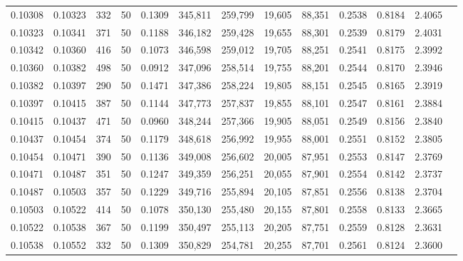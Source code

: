 \begin{tabular}{rrrrrrrrrrrrr}
0.10308 & 0.10323 &   332 &  50 &                                     0.1309 & 345,811 & 259,799 &  19,605 &  88,351 & 0.2538 & 0.8184 & 2.4065 \\
0.10323 & 0.10341 &   371 &  50 &                                     0.1188 & 346,182 & 259,428 &  19,655 &  88,301 & 0.2539 & 0.8179 & 2.4031 \\
0.10342 & 0.10360 &   416 &  50 &                                     0.1073 & 346,598 & 259,012 &  19,705 &  88,251 & 0.2541 & 0.8175 & 2.3992 \\
0.10360 & 0.10382 &   498 &  50 &                                     0.0912 & 347,096 & 258,514 &  19,755 &  88,201 & 0.2544 & 0.8170 & 2.3946 \\
0.10382 & 0.10397 &   290 &  50 &                                     0.1471 & 347,386 & 258,224 &  19,805 &  88,151 & 0.2545 & 0.8165 & 2.3919 \\
0.10397 & 0.10415 &   387 &  50 &                                     0.1144 & 347,773 & 257,837 &  19,855 &  88,101 & 0.2547 & 0.8161 & 2.3884 \\
0.10415 & 0.10437 &   471 &  50 &                                     0.0960 & 348,244 & 257,366 &  19,905 &  88,051 & 0.2549 & 0.8156 & 2.3840 \\
0.10437 & 0.10454 &   374 &  50 &                                     0.1179 & 348,618 & 256,992 &  19,955 &  88,001 & 0.2551 & 0.8152 & 2.3805 \\
0.10454 & 0.10471 &   390 &  50 &                                     0.1136 & 349,008 & 256,602 &  20,005 &  87,951 & 0.2553 & 0.8147 & 2.3769 \\
0.10471 & 0.10487 &   351 &  50 &                                     0.1247 & 349,359 & 256,251 &  20,055 &  87,901 & 0.2554 & 0.8142 & 2.3737 \\
0.10487 & 0.10503 &   357 &  50 &                                     0.1229 & 349,716 & 255,894 &  20,105 &  87,851 & 0.2556 & 0.8138 & 2.3704 \\
0.10503 & 0.10522 &   414 &  50 &                                     0.1078 & 350,130 & 255,480 &  20,155 &  87,801 & 0.2558 & 0.8133 & 2.3665 \\
0.10522 & 0.10538 &   367 &  50 &                                     0.1199 & 350,497 & 255,113 &  20,205 &  87,751 & 0.2559 & 0.8128 & 2.3631 \\
0.10538 & 0.10552 &   332 &  50 &                                     0.1309 & 350,829 & 254,781 &  20,255 &  87,701 & 0.2561 & 0.8124 & 2.3600 \\

\end{tabular}
